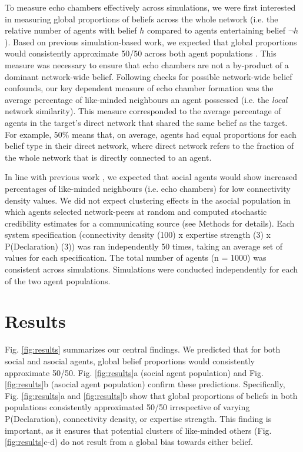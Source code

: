 \documentclass[fleqn,10pt]{wlscirep}
\begin{document}
To measure echo chambers effectively across simulations, we were first interested in measuring global proportions of beliefs across the whole network (i.e. the relative number of agents with belief \(h\) compared to agents entertaining belief \(\neg h\)). Based on previous simulation-based work, we expected that global proportions would consistently approximate 50/50 across both agent populations \cite{pilditch2017opinion}. This measure was necessary to ensure that echo chambers are not a by-product of a dominant network-wide belief. Following checks for possible network-wide belief confounds, our key dependent measure of echo chamber formation was the average percentage of like-minded neighbours an agent possessed (i.e. the \textit{local} network similarity). This measure corresponded to the average percentage of agents in the target's direct network that shared the same belief as the target. For example, 50\% means that, on average, agents had equal proportions for each belief type in their direct network, where direct network refers to the fraction of the whole network that is directly connected to an agent. 

In line with previous work \cite{pilditch2017opinion}, we expected that social agents would show increased percentages of like-minded neighbours (i.e. echo chambers) for low connectivity density values. We did not expect clustering effects in the asocial population in which agents selected network-peers at random and computed stochastic credibility estimates for a communicating source (see Methods for details). Each system specification (connectivity density (100) x expertise strength (3) x P(Declaration) (3)) was ran independently 50 times, taking an average set of values for each specification. The total number of agents (n = 1000) was consistent across simulations. Simulations were conducted independently for each of the two agent populations.

\section*{Results}

Fig. \ref{fig:results} summarizes our central findings. We predicted that for both social and asocial agents, global belief proportions would consistently approximate 50/50. Fig. \ref{fig:results}a (social agent population) and Fig. \ref{fig:results}b (asocial agent population) confirm these predictions. Specifically, Fig.  \ref{fig:results}a and \ref{fig:results}b show that global proportions of beliefs in both populations consistently approximated 50/50 irrespective of varying P(Declaration), connectivity density, or expertise strength. This finding is important, as it ensures that potential clusters of like-minded others (Fig. \ref{fig:results}c-d) do not result from a global bias towards either belief.
\end{document}
